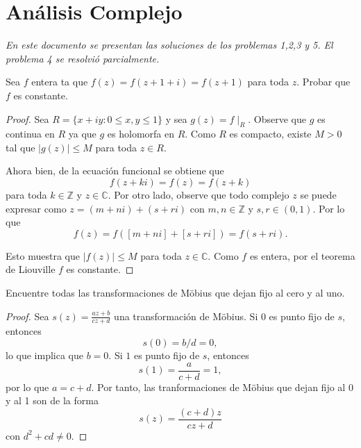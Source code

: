 \documentclass[12pt]{article}
\newcommand{\Z}{\mathbb{Z}}
\newcommand{\C}{\mathbb{C}}
\newenvironment{problem}[2][Problema]{\begin{trivlist}
\item[\hskip \labelsep {\bfseries #1}\hskip \labelsep {\bfseries #2.}]}{\end{trivlist}}
\begin{document}
\section*{Análisis Complejo}

\noindent \textit{En este documento se presentan las soluciones de los problemas 1,2,3 y 5. El problema 4 se resolvió parcialmente.}

\text{ }
\begin{problem}{1}
Sea $f$ entera ta que $f(z) = f(z+1 +i) = f(z+1)$ para toda $z$. Probar que $f$ es constante. 
\end{problem}

\begin{proof} 
 Sea $R = \{ x + i y: 0 \leq x, y \leq 1\}$ y sea $g(z) = f\mid_R$. Observe que $g$ es continua en $R$ ya que $g$ es holomorfa en $R$. Como $R$ es compacto, existe $M > 0$ tal que $\lvert g(z) \rvert \leq M$ para toda $z \in R$.
 
 Ahora bien, de la ecuación funcional se obtiene que 
 $$
 f(z + ki) = f(z) = f(z + k) 
 $$
 para toda $k \in \Z$ y $z \in \C.$ Por otro lado, observe que todo complejo $z$ se puede expresar como $z = (m + ni) + (s + r i)$ con $m, n \in \Z$ y $s, r \in (0, 1).$ Por lo que 
 $$ f(z) = f( [m + ni] + [s + r i] )  = f(s + ri).$$
 
 Esto muestra que $\lvert f(z) \rvert \leq M$ para toda $z \in \C$. Como $f$ es entera, por el teorema de Liouville $f$ es constante.  
\end{proof}

\begin{problem}{2}
Encuentre todas las transformaciones de Möbius que dejan fijo al cero y al uno.
\end{problem}
\begin{proof}
 Sea $s(z) = \frac{az + b}{cz + d}$ una transformación de Möbius. Si $0$ es punto fijo de $s$, entonces 
 $$s(0) = b/d = 0,$$
 lo que implica que $b = 0.$
 Si $1$ es punto fijo de $s$, entonces
 $$s(1) = \frac{a}{c +d} = 1,$$
 por lo que $a = c + d.$
 Por tanto, las tranformaciones de Möbius que dejan fijo al 0 y al 1 son de la forma
 $$ s(z) = \frac{(c+d)z}{cz + d}$$
 con $d^2 + cd \neq 0.$
\end{proof}
\end{document}
